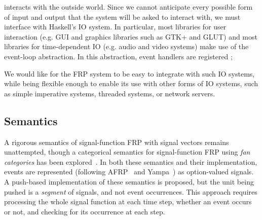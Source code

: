 interacts with the outside world. Since we cannot anticipate every
possible form of input and output that the system will be asked to interact
with, we must interface with Haskell's IO system. 
In particular, most libraries
for user interaction (e.g. GUI and graphics libraries such as GTK+ and GLUT) and
most libraries for time-dependent IO (e.g. audio and video systems) make use of
the event-loop abstraction. In this abstraction, event handlers are registered
; 


We would like for the FRP system to be easy to integrate with such IO systems,
while being flexible enough to enable its use with other forms of IO systems,
such as simple imperative systems, threaded systems, or network servers.

\subsection{Semantics}
\label{subsection:System_Design_and_Interface-Semantics}

A rigorous 
semantics of signal-function FRP with signal
vectors remains unattempted, though a categorical semantics for signal-function
FRP using {\em fan categories} has been explored~\cite{Jeffrey2012}. In both
these semantics and their implementation, events are represented (following
AFRP~\cite{Courtney2001-1} and Yampa~\cite{Nilsson2005}) as option-valued
signals. A push-based implementation of these semantics is proposed, but the
unit being pushed is a {\em segment} of signals, and not event occurrences. This
approach requires processing the whole signal function at each time step,
whether an event occurs or not, and checking for its occurrence at each step.

